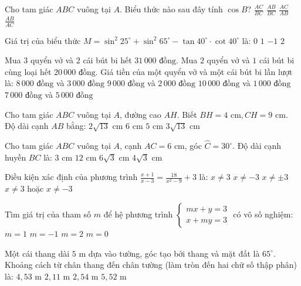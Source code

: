 \documentclass[12pt,a4paper]{article}
\begin{document}
\begin{ex}
Cho tam giác $ABC$ vuông tại $A$. Biểu thức nào sau đây tính $\cos B$?
\choice
{$\frac{AC}{BC}$}
{\True $\frac{AB}{BC}$}
{$\frac{AC}{AB}$}
{$\frac{AB}{AC}$}
\end{ex}

\begin{ex}
Giá trị của biểu thức $M = \sin^2 25^\circ + \sin^2 65^\circ - \tan 40^\circ \cdot \cot 40^\circ$ là:
\choice
{\True $0$}
{$1$}
{$-1$}
{$2$}
\end{ex}

\begin{ex}
Mua $3$ quyển vở và $2$ cái bút bi hết $31\,000\text{ đồng}$. Mua $2$ quyển vở và $1$ cái bút bi cùng loại hết $20\,000\text{ đồng}$. Giá tiền của một quyển vở và một cái bút bi lần lượt là:
\choice
{$8\,000\text{ đồng}$ và $3\,000\text{ đồng}$}
{\True $9\,000\text{ đồng}$ và $2\,000\text{ đồng}$}
{$10\,000\text{ đồng}$ và $1\,000\text{ đồng}$}
{$7\,000\text{ đồng}$ và $5\,000\text{ đồng}$}
\end{ex}

\begin{ex}
Cho tam giác $ABC$ vuông tại $A$, đường cao $AH$. Biết $BH = 4\text{ cm}, CH = 9\text{ cm}$. Độ dài cạnh $AB$ bằng:
\choice
{\True $2\sqrt{13}\text{ cm}$}
{$6\text{ cm}$}
{$5\text{ cm}$}
{$3\sqrt{13}\text{ cm}$}
\end{ex}

\begin{ex}
Cho tam giác $ABC$ vuông tại $A$, cạnh $AC = 6\text{ cm}$, góc $\widehat{C} = 30^\circ$. Độ dài cạnh huyền $BC$ là:
\choice
{$3\text{ cm}$}
{$12\text{ cm}$}
{$6\sqrt{3}\text{ cm}$}
{\True $4\sqrt{3}\text{ cm}$}
\end{ex}

\begin{ex}
Điều kiện xác định của phương trình $\frac{x+1}{x-3} = \frac{18}{x^2-9} + 3$ là:
\choice
{$x \neq 3$}
{$x \neq -3$}
{\True $x \neq \pm 3$}
{$x \neq 3$ hoặc $x \neq -3$}
\end{ex}

\begin{ex}
Tìm giá trị của tham số $m$ để hệ phương trình $\begin{cases} mx + y = 3 \\ x + my = 3 \end{cases}$ có vô số nghiệm:
\choice
{\True $m = 1$}
{$m = -1$}
{$m = 2$}
{$m = 0$}
\end{ex}

\begin{ex}
Một cái thang dài $5\text{ m}$ dựa vào tường, góc tạo bởi thang và mặt đất là $65^\circ$. Khoảng cách từ chân thang đến chân tường (làm tròn đến hai chữ số thập phân) là:
\choice
{$4{,}53\text{ m}$}
{\True $2{,}11\text{ m}$}
{$2{,}54\text{ m}$}
{$5{,}52\text{ m}$}
\end{ex}
\end{document}
